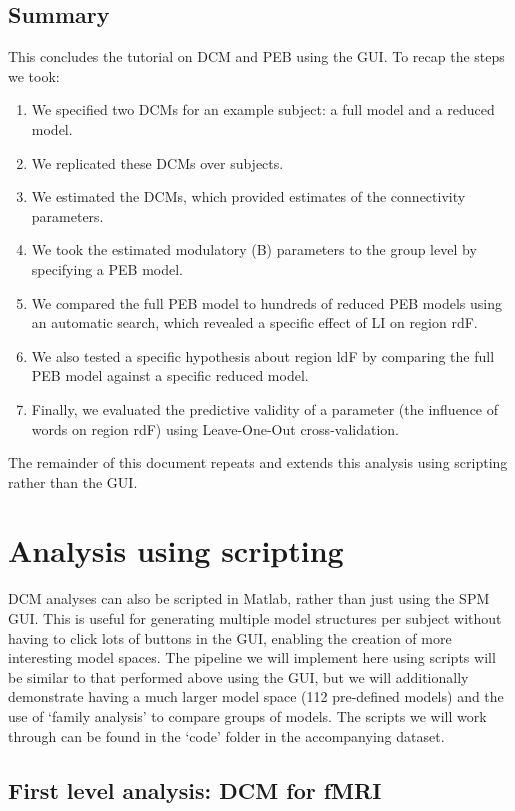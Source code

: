 \documentclass{article}
\begin{document}
\subsection{Summary} \label{GUI_summary}
This concludes the tutorial on DCM and PEB using the GUI. To recap the steps we took:
\begin{enumerate}
    \item We specified two DCMs for an example subject: a full model and a reduced model.
    \item We replicated these DCMs over subjects.
    \item We estimated the DCMs, which provided estimates of the connectivity parameters.
    \item We took the estimated modulatory (B) parameters to the group level by specifying a PEB model.
    \item We compared the full PEB model to hundreds of reduced PEB models using an automatic search, which revealed a specific effect of LI on region rdF.
    \item We also tested a specific hypothesis about region ldF by comparing the full PEB model against a specific reduced model.
    \item Finally, we evaluated the predictive validity of a parameter (the influence of words on region rdF) using Leave-One-Out cross-validation.
\end{enumerate}

The remainder of this document repeats and extends this analysis using scripting rather than the GUI.

\section{Analysis using scripting}

DCM analyses can also be scripted in Matlab, rather than just using the SPM GUI. This is useful for generating multiple model structures per subject without having to click lots of buttons in the GUI, enabling the creation of more interesting model spaces. The pipeline we will implement here using scripts will be similar to that performed above using the GUI, but we will additionally demonstrate having a much larger model space (112 pre-defined models) and the use of `family analysis' to compare groups of models. The scripts we will work through can be found in the `code' folder in the accompanying dataset.

\subsection{First level analysis: DCM for fMRI}
\end{document}
